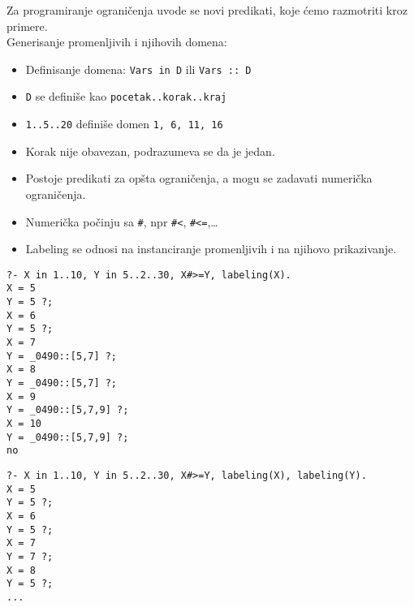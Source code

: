 \documentclass[../main.tex]{subfiles}
\begin{document}
Za programiranje ograničenja uvode se novi predikati, koje ćemo razmotriti kroz primere.
\\
Generisanje promenljivih i njihovih domena:
\begin{itemize}
\item Definisanje domena: \texttt{Vars in D} ili \texttt{Vars :: D}
\item \texttt{D} se definiše kao \texttt{pocetak..korak..kraj}
\item \texttt{1..5..20} definiše domen \texttt{1, 6, 11, 16}
\item Korak nije obavezan, podrazumeva se da je jedan.
\item Postoje predikati za opšta ograničenja, a mogu se zadavati numerička ograničenja.
\item Numerička počinju sa \texttt{\#}, npr \texttt{\#<}, \texttt{\#<=},\ldots
\item Labeling se odnosi na instanciranje promenljivih i na njihovo prikazivanje.
\end{itemize}

\begin{boxprimer}
\begin{multicols}{2}
\begin{Verbatim}
?- X in 1..10, Y in 5..2..30, X#>=Y, labeling(X).
X = 5
Y = 5 ?;
X = 6
Y = 5 ?;
X = 7
Y = _0490::[5,7] ?;
X = 8
Y = _0490::[5,7] ?;
X = 9
Y = _0490::[5,7,9] ?;
X = 10
Y = _0490::[5,7,9] ?;
no
\end{Verbatim}
\columnbreak
{}
\end{multicols}
\end{boxprimer}

\begin{boxprimer}
\begin{multicols}{2}

\begin{Verbatim}
?- X in 1..10, Y in 5..2..30, X#>=Y, labeling(X), labeling(Y).
X = 5
Y = 5 ?;
X = 6
Y = 5 ?;
X = 7
Y = 7 ?;
X = 8
Y = 5 ?;
...
\end{Verbatim}
\columnbreak
{}
\end{multicols}
\end{boxprimer}
\end{document}
